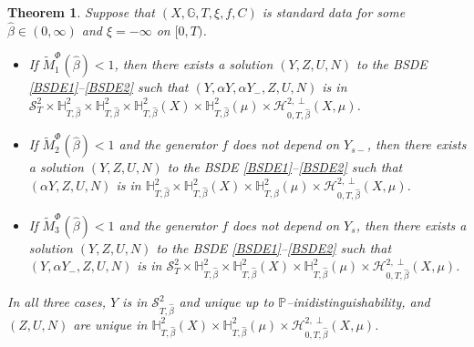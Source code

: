 \documentclass[10pt]{article} %
\newtheorem{theorem}{Theorem}[section]
\newcommand\cH{\mathcal H}
\newcommand\cS{\mathcal S}
\def \G{\mathbb{G}}
\def \H{\mathbb{H}}
\def \P{\mathbb{P}}
\newcommand{\1}{\mathbf{1}}
\begin{document}
\begin{theorem}\label{thm::main_bsde}
	Suppose that $(X,\G,T,\xi,f,C)$ is standard data for some $\hat\beta \in (0,\infty)$ and $\xi = -\infty$ on $[0,T)$.
	
	\begin{itemize}
	\item[$(i)$] If $\widetilde M_1^\Phi(\hat\beta) < 1$, then there exists a solution $(Y,Z,U,N)$ to the {\rm BSDE} \ref{BSDE1}--\ref{BSDE2} such that $(Y,\alpha Y,\alpha Y_-,Z,U,N)$ is in $\cS^2_T \times \H^2_{T,\hat\beta} \times \H^2_{T,\hat\beta} \times \H^2_{T,\hat\beta}(X) \times \H^2_{T,\hat\beta}(\mu) \times \cH^{2,\perp}_{0,T,\hat\beta}(X,\mu)$. %
	
	
	\item[$(ii)$] If $\widetilde M_2^\Phi(\hat\beta) < 1$ and the generator $f$ does not depend on $Y_{s-}$, then there exists a solution $(Y,Z,U,N)$ to the {\rm BSDE} \ref{BSDE1}--\ref{BSDE2} such that $(\alpha Y,Z,U,N)$ is in $\H^2_{T,\hat\beta} \times \H^2_{T,\hat\beta}(X) \times \H^2_{T,\hat\beta}(\mu) \times \cH^{2,\perp}_{0,T,\hat\beta}(X,\mu)$. %


	\item[$(iii)$] If $\widetilde M_3^\Phi(\hat\beta) < 1$ and the generator $f$ does not depend on $Y_s$, then there exists a solution $(Y,Z,U,N)$ to the {\rm BSDE} \ref{BSDE1}--\ref{BSDE2} such that $(Y,\alpha Y_-,Z,U,N)$ is in $\cS^2_T \times \H^2_{T,\hat\beta} \times \H^2_{T,\hat\beta}(X) \times \H^2_{T,\hat\beta}(\mu) \times \cH^{2,\perp}_{0,T,\hat\beta}(X,\mu)$.
	\end{itemize}
	
	In all three cases, $Y$ is in $\cS^2_{T,\hat\beta}$ and unique up to $\P$--inidistinguishability, and $(Z,U,N)$ are unique in $\H^2_{T,\hat\beta}(X) \times \H^2_{T,\hat\beta}(\mu) \times \cH^{2,\perp}_{0,T,\hat\beta}(X,\mu)$.
\end{theorem}
\end{document}
